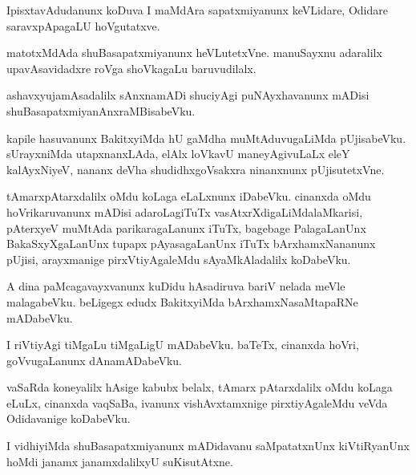 \documentclass{article}
\begin{document}
\begin{mn}
IpisxtavAdudanunx  koDuva  I  maMdAra sapatxmiyanunx  keVLidare,  Odidare  
saravxpApagaLU  hoVgutatxve.
\end{mn}

\begin{mn}
matotxMdAda  shuBasapatxmiyanunx  heVLutetxVne.  manuSayxnu  adaralilx  
upavAsavidadxre  roVga shoVkagaLu  baruvudilalx.
\end{mn}

\begin{mn}
ashavxyujamAsadalilx  sAnxnamADi  shuciyAgi  puNAyxhavanunx  mADisi  shuBasapatxmiyanAnxraMBisabeVku.
\end{mn}

\begin{mn}
kapile  hasuvanunx  BakitxyiMda  hU  gaMdha  muMtAduvugaLiMda  pUjisabeVku.  sUrayxniMda  
utapxnanxLAda,  elAlx  loVkavU  maneyAgivuLaLx  eleY  kalAyxNiyeV,  nananx  deVha 
shudidhxgoVsakxra  ninanxnunx  pUjisutetxVne.
\end{mn}

\begin{mn}
tAmarxpAtarxdalilx  oMdu  koLaga  eLaLxnunx  iDabeVku.  cinanxda  oMdu  hoVrikaruvanunx  
mADisi  adaroLagiTuTx  vasAtxrXdigaLiMdalaMkarisi,  pAterxyeV  muMtAda  parikaragaLanunx  
iTuTx,  bagebage  PalagaLanUnx  BakaSxyXgaLanUnx  tupapx  pAyasagaLanUnx  iTuTx  
bArxhamxNananunx  pUjisi,  arayxmanige  pirxVtiyAgaleMdu  sAyaMkAladalilx  koDabeVku.
\end{mn}

\begin{mn}
A  dina  paMcagavayxvanunx  kuDidu  hAsadiruva  bariV  nelada  meVle  malagabeVku.  beLigegx  
edudx  BakitxyiMda  bArxhamxNasaMtapaRNe  mADabeVku.
\end{mn}

\begin{mn}
I riVtiyAgi  tiMgaLu  tiMgaLigU  mADabeVku.  baTeTx,  cinanxda hoVri,  goVvugaLanunx  dAnamADabeVku.
\end{mn}

\begin{mn}
vaSaRda  koneyalilx  hAsige  kabubx  belalx,  tAmarx pAtarxdalilx  oMdu koLaga  eLuLx,  cinanxda vaqSaBa,  
ivanunx  vishAvxtamxnige  pirxtiyAgaleMdu  veVda  Odidavanige  koDabeVku.
\end{mn}

\begin{mn}
I vidhiyiMda  shuBasapatxmiyanunx  mADidavanu  saMpatatxnUnx  kiVtiRyanUnx  hoMdi  janamx janamxdalilxyU  suKisutAtxne.
\end{mn}
\end{document}
